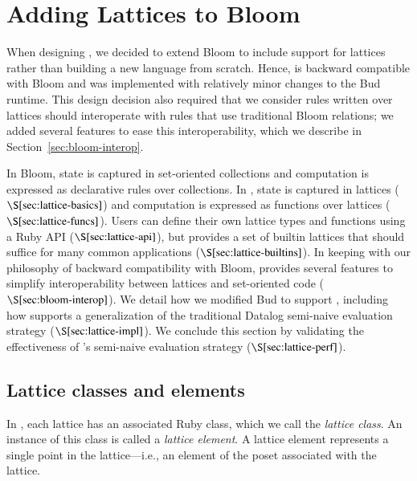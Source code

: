 \section{Adding Lattices to Bloom}
\label{sec:impl}



When designing \lang, we decided to extend Bloom to include support for
lattices rather than building a new language from scratch. Hence, \lang is
backward compatible with Bloom and was implemented with relatively minor
changes to the Bud runtime. This design decision also required that we consider
rules written over lattices should interoperate with rules that use traditional
Bloom relations; we added several \lang features to ease this interoperability,
which we describe in Section~\ref{sec:bloom-interop}.

In Bloom, state is captured in set-oriented collections and computation is
expressed as declarative rules over collections. In \lang, state is captured in
lattices ($\S \ref{sec:lattice-basics}$) and computation is expressed as
functions over lattices ($\S \ref{sec:lattice-funcs}$). Users can define their
own lattice types and functions using a Ruby API ($\S \ref{sec:lattice-api}$),
but \lang provides a set of builtin lattices that should suffice for many common
applications ($\S \ref{sec:lattice-builtins}$). In keeping with our philosophy
of backward compatibility with Bloom, \lang provides several features to
simplify interoperability between lattices and set-oriented code ($\S
\ref{sec:bloom-interop}$). We detail how we modified Bud to support \lang,
including how \lang supports a generalization of the traditional Datalog
semi-naive evaluation strategy ($\S \ref{sec:lattice-impl}$). We conclude this
section by validating the effectiveness of \lang's semi-naive evaluation strategy
($\S \ref{sec:lattice-perf}$).

\subsection{Lattice classes and elements}
\label{sec:lattice-basics}

In \lang, each lattice has an associated Ruby class, which we call the
\emph{lattice class}. An instance of this class is called a \emph{lattice
  element}. A lattice element represents a single point in the lattice---i.e., an
element of the poset associated with the lattice.

